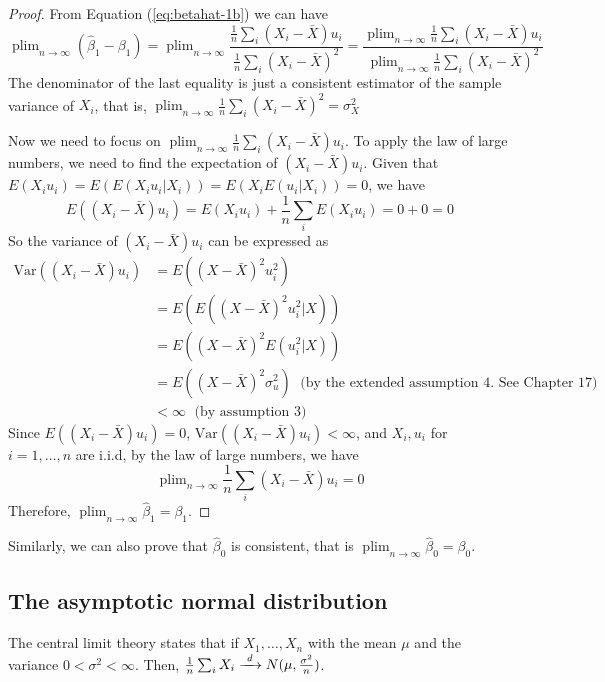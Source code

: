 \documentclass[a4paper,11pt]{article}
\newcommand{\var}{\mathrm{Var}}
\DeclareMathOperator*{\plim}{plim}
\newcommand{\plimn}{\plim_{n \rightarrow \infty}}
\begin{document}
\begin{proof}
From Equation (\ref{eq:betahat-1b}) we can have
\[
\plimn (\hat{\beta}_1 -\beta_1) = \plimn \frac{\frac{1}{n}\sum_i (X_i - \bar{X})u_i}{\frac{1}{n}\sum_i (X_i - \bar{X})^2}
= \frac{\plimn \frac{1}{n}\sum_i (X_i - \bar{X})u_i}{\plimn \frac{1}{n}\sum_i (X_i - \bar{X})^2}
\]
The denominator of the last equality is just a consistent estimator of the sample variance of $X_i$, that is,
$\plimn \frac{1}{n}\sum_i (X_i - \bar{X})^2 = \sigma^2_X$

Now we need to focus on $\plimn \frac{1}{n}\sum_i (X_i - \bar{X}) u_i$. To apply the law of large numbers,
we need to find the expectation of $(X_i - \bar{X})u_i$. Given that
$E(X_i u_i) = E(E(X_i u_i |X_i)) = E(X_i E(u_i |X_i)) = 0$, we have
\[ E((X_i - \bar{X})u_i) = E(X_i u_i) + \frac{1}{n} \sum_i E(X_i u_i)
= 0 + 0 = 0  \]
So the variance of $(X_i - \bar{X})u_i$ can be expressed as
\begin{equation*}
\begin{split}
\var((X_i - \bar{X})u_i) &= E((X-\bar{X})^2 u_i^2) \\
&= E(E((X - \bar{X})^2 u_i^2|X)) \\
&= E((X-\bar{X})^2 E(u_i^2|X)) \\
&= E((X-\bar{X})^2 \sigma_u^2)\; \text{ (by the extended assumption 4. See Chapter 17)} \\
&< \infty\; \text{ (by assumption 3)}
\end{split}
\end{equation*}
Since $E((X_i - \bar{X})u_i) = 0$, $\var((X_i - \bar{X})u_i) < \infty$, and $X_i, u_i$ for $i=1, \ldots, n$ are i.i.d,
by the law of large numbers, we have
\[ \plimn \frac{1}{n} \sum_i (X_i - \bar{X}) u_i = 0 \]
Therefore, $\plimn \hat{\beta}_1 = \beta_1$.
\end{proof}

Similarly, we can also prove that \(\hat{\beta}_0\) is consistent, that
is \(\plimn \hat{\beta}_0 = \beta_0\).

\subsection{The asymptotic normal distribution}
\label{sec:org95105dc}
The central limit theory states that if \(X_1, \ldots, X_n\) with the mean
\(\mu\) and the variance \(0 < \sigma^2 < \infty\). Then,
\(\frac{1}{n}\sum_i X_i \xrightarrow{\text{ \textit d }}
N(\mu, \frac{\sigma^2}{n})\).
\end{document}
